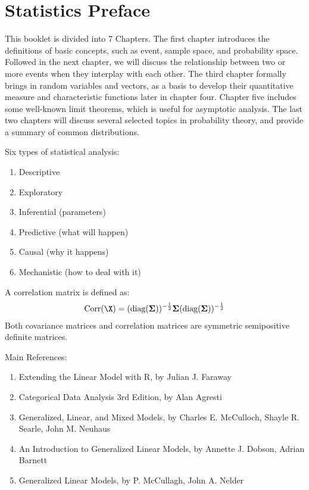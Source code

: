 \section{Statistics Preface}
This booklet is divided into 7 Chapters. The first chapter introduces the definitions of basic concepts, such as event, sample space, and probability space. Followed in the next chapter, we will discuss the relationship between two or more events when they interplay with each other. The third chapter formally brings in random variables and vectors, as a basis to develop their quantitative measure and characteristic functions later in chapter four. Chapter five includes some well-known limit theorems, which is useful for asymptotic analysis. The last two chapters will discuss several selected topics in probability theory, and provide a summary of common distributions.

Six types of statistical analysis:
\begin{enumerate}
	\item Descriptive
	\item Exploratory
	\item Inferential (parameters)
	\item Predictive (what will happen)
	\item Causal (why it happens)
	\item Mechanistic (how to deal with it)
\end{enumerate}


A correlation matrix is defined as:
\begin{align}
	\text{Corr}(\X) = (\text{diag}(\bSigma))^{-\frac{1}{2}} \bSigma (\text{diag}(\bSigma))^{-\frac{1}{2}}
\end{align}
Both covariance matrices and correlation matrices are symmetric semipositive definite matrices.


Main References:
\begin{enumerate}
	\item Extending the Linear Model with R, by Julian J. Faraway
	\item Categorical Data Analysis 3rd Edition, by Alan Agresti
	\item Generalized, Linear, and Mixed Models, by Charles E. McCulloch, Shayle R. Searle, John M. Neuhaus
	\item An Introduction to Generalized Linear Models, by Annette J. Dobson, Adrian Barnett
	\item Generalized Linear Models, by P. McCullagh, John A. Nelder
\end{enumerate}

